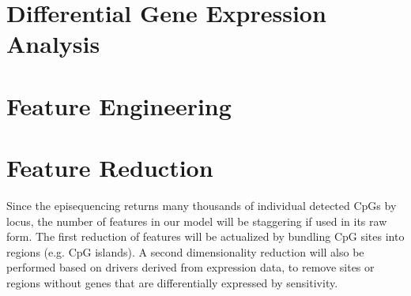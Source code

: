 \section{Differential Gene Expression Analysis}



\section{Feature Engineering}



\section{Feature Reduction}

Since the episequencing returns many thousands of individual detected CpGs by locus, the number of features in our model will be staggering if used in its raw form. The first reduction of features will be actualized by bundling CpG sites into regions (e.g. CpG islands). A second dimensionality reduction will also be performed based on drivers derived from expression data, to remove sites or regions without genes that are differentially expressed by sensitivity.
